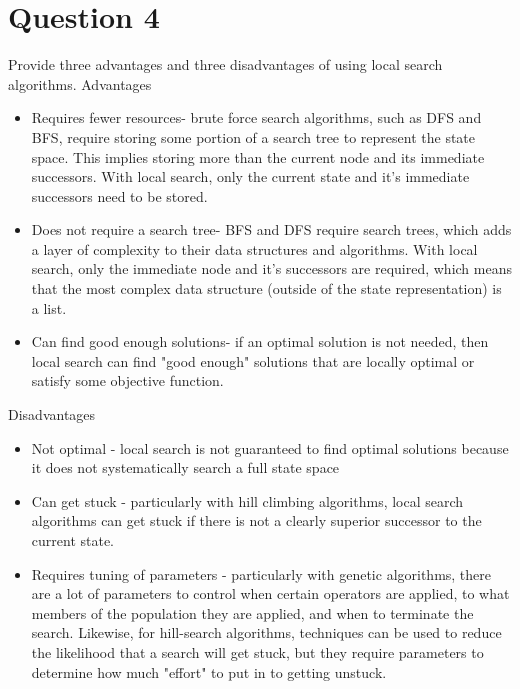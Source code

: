 \documentclass{article}
\begin{document}
    \section*{Question 4}
    Provide three advantages and three disadvantages of using local search algorithms.
    \newline
    Advantages
    \begin{itemize}
        \item Requires fewer resources- brute force search algorithms, such as DFS and BFS, require storing some portion of a search tree to represent the state space. This implies storing more than the current node and its immediate successors. With local search, only the current state and it's immediate successors need to be stored.
        \item Does not require a search tree- BFS and DFS require search trees, which adds a layer of complexity to their data structures and algorithms. With local search, only the immediate node and it's successors are required, which means that the most complex data structure (outside of the state representation) is a list.
        \item Can find good enough solutions- if an optimal solution is not needed, then local search can find "good enough" solutions that are locally optimal or satisfy some objective function.
    \end{itemize}
    \newline
    Disadvantages
    \begin{itemize}
        \item Not optimal - local search is not guaranteed to find optimal solutions because it does not systematically search a full state space
        \item Can get stuck - particularly with hill climbing algorithms, local search algorithms can get stuck if there is not a clearly superior successor to the current state.
        \item Requires tuning of parameters - particularly with genetic algorithms, there are a lot of parameters to control when certain operators are applied, to what members of the population they are applied, and when to terminate the search. Likewise, for hill-search algorithms, techniques can be used to reduce the likelihood that a search will get stuck, but they require parameters to determine how much "effort" to put in to getting unstuck.   
    \end{itemize}
\end{document}
